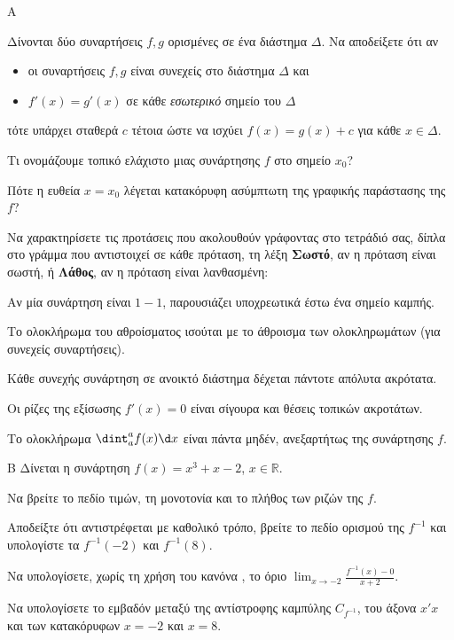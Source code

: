 \begin{thema}{Α}
\begin{erwthma}
    \item Δίνονται δύο συναρτήσεις $ f,g $ ορισμένες σε ένα διάστημα $ \varDelta $. Να αποδείξετε ότι αν
\begin{itemize}
\item οι συναρτήσεις $ f,g $ είναι συνεχείς στο διάστημα $ \varDelta $ και
\item $ f'(x)=g'(x) $ σε κάθε \emph{εσωτερικό} σημείο του $ \varDelta $
\end{itemize}
τότε υπάρχει σταθερά $ c $ τέτοια ώστε να ισχύει $ f(x)=g(x)+c $ για κάθε $ x\in\varDelta $. 
    \item Τι ονομάζουμε τοπικό ελάχιστο μιας συνάρτησης $f$ στο σημείο $x_0$? 
    \item Πότε η ευθεία $x = x_0$ λέγεται κατακόρυφη ασύμπτωτη της γραφικής παράστασης της $f$? 
    \item Να χαρακτηρίσετε τις προτάσεις που ακολουθούν γράφοντας στο τετράδιό σας, δίπλα στο γράμμα που αντιστοιχεί σε κάθε πρόταση, τη λέξη \textbf{Σωστό},
αν η πρόταση είναι σωστή, ή \textbf{Λάθος}, αν η πρόταση είναι λανθασμένη:
    \begin{alist}
        \item Αν μία συνάρτηση είναι $1-1$, παρουσιάζει υποχρεωτικά έστω ένα σημείο καμπής.
        \item Το ολοκλήρωμα του αθροίσματος ισούται με το άθροισμα των ολοκληρωμάτων (για συνεχείς συναρτήσεις).
        \item Κάθε συνεχής συνάρτηση σε ανοικτό διάστημα δέχεται πάντοτε απόλυτα ακρότατα.
        \item Οι ρίζες της εξίσωσης $f'(x)=0$ είναι σίγουρα και θέσεις τοπικών ακροτάτων.
        \item Το ολοκλήρωμα $\dint_a^a f(x) \d x$ είναι πάντα μηδέν, ανεξαρτήτως της συνάρτησης $f$.
    \end{alist} 
\end{erwthma}
\end{thema}

\begin{thema}{Β}
Δίνεται η συνάρτηση $f(x) = x^3 + x - 2$, $x \in \mathbb{R}$.
\begin{erwthma}
    \item Να βρείτε το πεδίο τιμών, τη μονοτονία και το πλήθος των ριζών της $f$. 
    \item Αποδείξτε ότι αντιστρέφεται με καθολικό τρόπο, βρείτε το πεδίο ορισμού της $f^{-1}$ και υπολογίστε τα $f^{-1}(-2)$ και $f^{-1}(8)$. 
    \item Να υπολογίσετε, χωρίς τη χρήση του κανόνα , το όριο $\displaystyle\lim_{x \to -2} \frac{f^{-1}(x) - 0}{x + 2}$. 
    \item Να υπολογίσετε το εμβαδόν μεταξύ της αντίστροφης καμπύλης $C_{f^{-1}}$, του άξονα $x'x$ και των κατακόρυφων $x=-2$ και $x=8$. 
\end{erwthma}
\end{thema}

